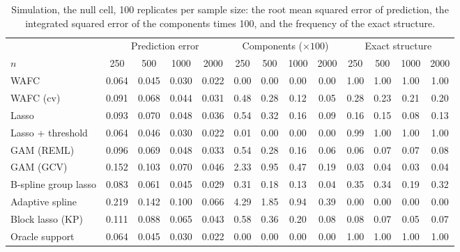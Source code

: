 \begin{table}[tp]
\caption{Simulation, the null cell, 100 replicates per sample size: the root mean squared error of prediction, the integrated squared error of the components times 100, and the frequency of the exact structure.}
\label{tab:sim-sizes-null}
\centering
\footnotesize
\setlength{\tabcolsep}{3pt}
\begin{tabular}{l cccc cccc cccc}
\hline
 & \multicolumn{4}{c}{Prediction error} & \multicolumn{4}{c}{Components ($\times 100$)} & \multicolumn{4}{c}{Exact structure} \\
$n$ & 250 & 500 & 1000 & 2000 & 250 & 500 & 1000 & 2000 & 250 & 500 & 1000 & 2000 \\
\hline
WAFC & 0.064 & 0.045 & 0.030 & 0.022 & 0.00 & 0.00 & 0.00 & 0.00 & 1.00 & 1.00 & 1.00 & 1.00 \\
WAFC (cv) & 0.091 & 0.068 & 0.044 & 0.031 & 0.48 & 0.28 & 0.12 & 0.05 & 0.28 & 0.23 & 0.21 & 0.20 \\
Lasso & 0.093 & 0.070 & 0.048 & 0.036 & 0.54 & 0.32 & 0.16 & 0.09 & 0.16 & 0.15 & 0.08 & 0.13 \\
Lasso + threshold & 0.064 & 0.046 & 0.030 & 0.022 & 0.01 & 0.00 & 0.00 & 0.00 & 0.99 & 1.00 & 1.00 & 1.00 \\
GAM (REML) & 0.096 & 0.069 & 0.048 & 0.033 & 0.54 & 0.28 & 0.16 & 0.06 & 0.06 & 0.07 & 0.07 & 0.08 \\
GAM (GCV) & 0.152 & 0.103 & 0.070 & 0.046 & 2.33 & 0.95 & 0.47 & 0.19 & 0.03 & 0.04 & 0.03 & 0.04 \\
B-spline group lasso & 0.083 & 0.061 & 0.045 & 0.029 & 0.31 & 0.18 & 0.13 & 0.04 & 0.35 & 0.34 & 0.19 & 0.32 \\
Adaptive spline & 0.219 & 0.142 & 0.100 & 0.066 & 4.29 & 1.85 & 0.94 & 0.39 & 0.00 & 0.00 & 0.00 & 0.00 \\
Block lasso (KP) & 0.111 & 0.088 & 0.065 & 0.043 & 0.58 & 0.36 & 0.20 & 0.08 & 0.08 & 0.07 & 0.05 & 0.07 \\
Oracle support & 0.064 & 0.045 & 0.030 & 0.022 & 0.00 & 0.00 & 0.00 & 0.00 & 1.00 & 1.00 & 1.00 & 1.00 \\
\hline
\end{tabular}
\end{table}

